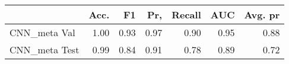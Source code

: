 \begin{tabular}{lrrrrrr}
\toprule
{} &  Acc. &    F1 &   Pr, &  Recall &   AUC &  Avg. pr \\
\midrule
CNN\_meta Val  &  1.00 &  0.93 &  0.97 &    0.90 &  0.95 &     0.88 \\
CNN\_meta Test &  0.99 &  0.84 &  0.91 &    0.78 &  0.89 &     0.72 \\
\bottomrule
\end{tabular}
